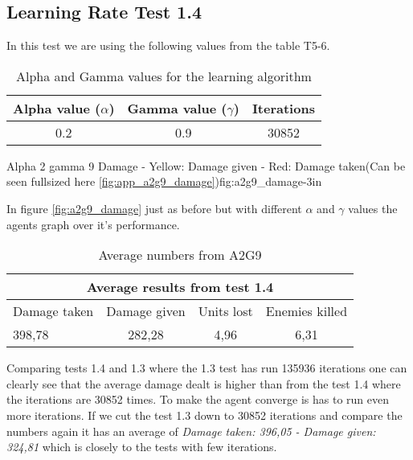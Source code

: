 \subsection*{Learning Rate Test 1.4}
In this test we are using the following values from the table T5-6.



\begin{table}[H]
\begin{centering}
 \begin{tabular}{|c|c|c|}
	\hline
		Alpha value ($\alpha$) & Gamma value ($\gamma$) & Iterations\\
	\hline
		0.2 & 0.9 & 30852 \\
	\hline
\end{tabular}
\label{a2g9_table}
\caption{Alpha and Gamma values for the learning algorithm}
\end{centering}
\end{table}


			{Alpha 2 gamma 9 Damage - Yellow: Damage given - Red: Damage taken(Can be seen fullsized here \ref{fig:app_a2g9_damage})}{fig:a2g9_damage}{-3in}

In figure \ref{fig:a2g9_damage} just as before but with different $\alpha$ and $\gamma$ values the agents graph over it's performance.




\begin{table}
\begin{centering}

 \begin{tabular}{|l|c|c|c|}
	\multicolumn{4}{c}{Average results from test 1.4} \\
	\hline
		Damage taken & Damage given & Units lost & Enemies killed\\
	\hline
		398,78 & 282,28 & 4,96 & 6,31 \\
		\hline
\end{tabular}

\label{test1.4}
\caption{Average numbers from A2G9}
\end{centering}

\end{table}


Comparing tests 1.4 and 1.3 where the 1.3 test has run 135936 iterations one can clearly see that the average damage dealt is higher than from the test 1.4 where the iterations are 30852 times. To make the agent converge is has to run even more iterations. If we cut the test 1.3 down to 30852 iterations and compare the numbers again it has an average of \textit{Damage taken: 396,05 - Damage given: 324,81} which is closely to the tests with few iterations.\\